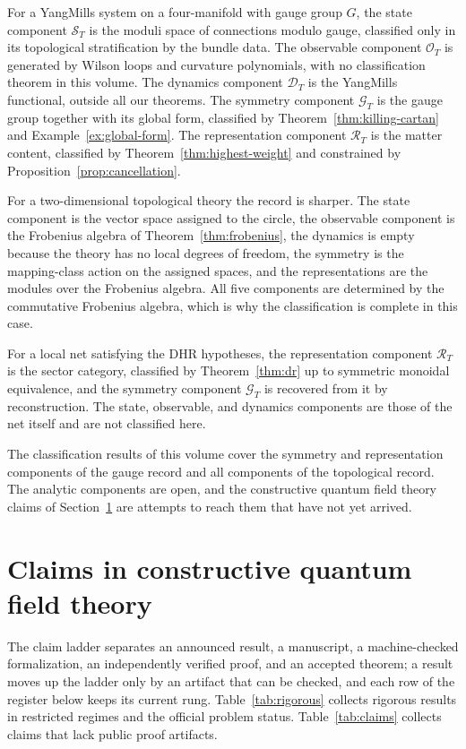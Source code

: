 \documentclass[11pt,letterpaper]{article}
\theoremstyle{definition}
\theoremstyle{remark}
\begin{document}
For a Yang\textendash{}Mills system on a four-manifold with gauge group $G$, the state component $\mathcal{S}_T$ is the moduli space of connections modulo gauge, classified only in its topological stratification by the bundle data. The observable component $\mathcal{O}_T$ is generated by Wilson loops and curvature polynomials, with no classification theorem in this volume. The dynamics component $\mathcal{D}_T$ is the Yang\textendash{}Mills functional, outside all our theorems. The symmetry component $\mathcal{G}_T$ is the gauge group together with its global form, classified by Theorem~\ref{thm:killing-cartan} and Example~\ref{ex:global-form}. The representation component $\mathcal{R}_T$ is the matter content, classified by Theorem~\ref{thm:highest-weight} and constrained by Proposition~\ref{prop:cancellation}.

For a two-dimensional topological theory the record is sharper. The state component is the vector space assigned to the circle, the observable component is the Frobenius algebra of Theorem~\ref{thm:frobenius}, the dynamics is empty because the theory has no local degrees of freedom, the symmetry is the mapping-class action on the assigned spaces, and the representations are the modules over the Frobenius algebra. All five components are determined by the commutative Frobenius algebra, which is why the classification is complete in this case.

For a local net satisfying the DHR hypotheses, the representation component $\mathcal{R}_T$ is the sector category, classified by Theorem~\ref{thm:dr} up to symmetric monoidal equivalence, and the symmetry component $\mathcal{G}_T$ is recovered from it by reconstruction. The state, observable, and dynamics components are those of the net itself and are not classified here.

The classification results of this volume cover the symmetry and representation components of the gauge record and all components of the topological record. The analytic components are open, and the constructive quantum field theory claims of Section~\ref{sec:claims} are attempts to reach them that have not yet arrived.

\section{Claims in constructive quantum field theory}
\label{sec:claims}

The claim ladder separates an announced result, a manuscript, a machine-checked formalization, an independently verified proof, and an accepted theorem; a result moves up the ladder only by an artifact that can be checked, and each row of the register below keeps its current rung. Table~\ref{tab:rigorous} collects rigorous results in restricted regimes and the official problem status. Table~\ref{tab:claims} collects claims that lack public proof artifacts.
\end{document}
